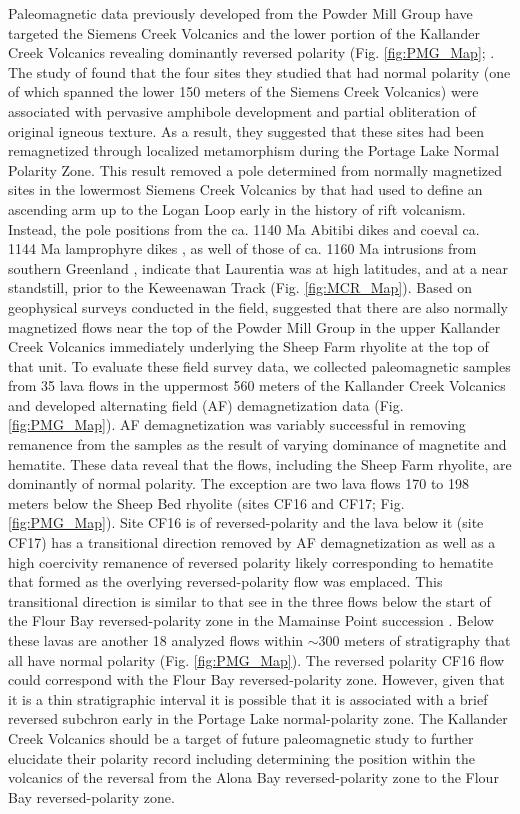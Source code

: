 \documentclass[11pt,letterpaper]{article}
\begin{document}
Paleomagnetic data previously developed from the Powder Mill Group have targeted the Siemens Creek Volcanics and the lower portion of the Kallander Creek Volcanics revealing dominantly reversed polarity (Fig. \ref{fig:PMG_Map}; \citealp{Books1972a,Palmer1986a}. The study of \cite{Palmer1986a} found that the four sites they studied that had normal polarity (one of which spanned the lower 150 meters of the Siemens Creek Volcanics) were associated with pervasive amphibole development and partial obliteration of original igneous texture. As a result, they suggested that these sites had been remagnetized through localized metamorphism during the Portage Lake Normal Polarity Zone. This result removed a pole determined from normally magnetized sites in the lowermost Siemens Creek Volcanics by \cite{Books1972a} that \cite{Halls1982a} had used to define an ascending arm up to the Logan Loop early in the history of rift volcanism. Instead, the pole positions from the ca. 1140 Ma Abitibi dikes \citep{Ernst1993a} and coeval ca. 1144 Ma lamprophyre dikes \citep{Piispa2018a}, as well of those of ca. 1160 Ma intrusions from southern Greenland \citep{Piper1992a, Upton2013a}, indicate that Laurentia was at high latitudes, and at a near standstill, prior to the Keweenawan Track (Fig. \ref{fig:MCR_Map}). Based on geophysical surveys conducted in the field, \cite{Nicholson1997a} suggested that there are also normally magnetized flows near the top of the Powder Mill Group in the upper Kallander Creek Volcanics immediately underlying the Sheep Farm rhyolite at the top of that unit. To evaluate these field survey data, we collected paleomagnetic samples from 35 lava flows in the uppermost 560 meters of the Kallander Creek Volcanics and developed alternating field (AF) demagnetization data (Fig. \ref{fig:PMG_Map}). AF demagnetization was variably successful in removing remanence from the samples as the result of varying dominance of magnetite and hematite. These data reveal that the flows, including the Sheep Farm rhyolite, are dominantly of normal polarity. The exception are two lava flows 170 to 198 meters below the Sheep Bed rhyolite (sites CF16 and CF17; Fig. \ref{fig:PMG_Map}). Site CF16 is of reversed-polarity and the lava below it (site CF17) has a transitional direction removed by AF demagnetization as well as a high coercivity remanence of reversed polarity likely corresponding to hematite that formed as the overlying reversed-polarity flow was emplaced. This transitional direction is similar to that see in the three flows below the start of the Flour Bay reversed-polarity zone in the Mamainse Point succession \citep{Swanson-Hysell2014a}. Below these lavas are another 18 analyzed flows within $\sim$300 meters of stratigraphy that all have normal polarity (Fig. \ref{fig:PMG_Map}). The reversed polarity CF16 flow could correspond with the Flour Bay reversed-polarity zone. However, given that it is a thin stratigraphic interval it is possible that it is associated with a brief reversed subchron early in the Portage Lake normal-polarity zone. The Kallander Creek Volcanics should be a target of future paleomagnetic study to further elucidate their polarity record including determining the position within the volcanics of the reversal from the Alona Bay reversed-polarity zone to the Flour Bay reversed-polarity zone.
\end{document}
